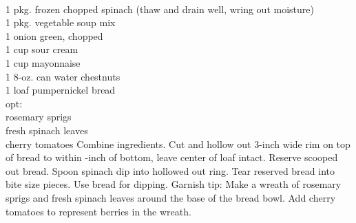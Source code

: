 \begin{minipage}{\linewidth}
\end{minipage}\par\begin{minipage}{\linewidth} 
\\

\end{minipage}\par\begin{minipage}{\linewidth} 
	\step
	{1 pkg. frozen chopped spinach (thaw and drain well, wring out moisture)\\
	 1 pkg. vegetable soup mix\\	
	 1 onion green, chopped\\
	 1 cup sour cream	\\
	 1 cup mayonnaise \\
	 1 8-oz. can water chestnuts	\\
	 1 loaf pumpernickel bread \\
	opt:\\
	rosemary sprigs\\
	fresh spinach leaves\\
	cherry tomatoes
		}{
Combine ingredients. Cut and hollow out 3-inch wide rim on top of bread to within -inch of bottom, leave center of loaf intact. Reserve scooped out bread. Spoon spinach dip into hollowed out ring. Tear reserved bread into bite size pieces. Use bread for dipping. Garnish tip:  Make a wreath of rosemary sprigs and fresh spinach leaves around the base of the bread bowl. Add cherry tomatoes to represent berries in the wreath.}


\end{minipage}
